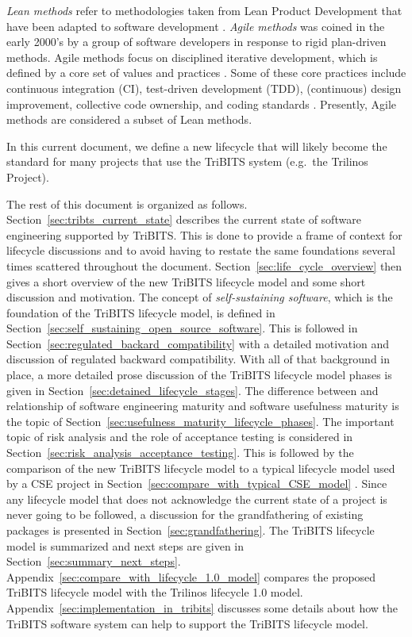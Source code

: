 \documentclass[11pt]{SANDreport}
\begin{document}
\textit{Lean methods} refer to methodologies taken from Lean Product Development that have been adapted to software development {}\cite{ImplementingLeanSoftwareDevelopment}.   \textit{Agile methods} was coined in the early 2000's by a group of software developers in response to rigid plan-driven methods. Agile methods focus on disciplined iterative development, which is defined by a core set of values and practices {}\cite{AgileSoftwareDevelopment, Scrum, XP2}.  Some of these core practices include continuous integration (CI), test-driven development (TDD), (continuous) design improvement, collective code ownership, and coding standards {}\cite{AgileSoftwareDevelopment, XP2}.  Presently, Agile methods are considered a subset of Lean methods.

In this current document, we define a new lifecycle that will likely become the standard for many projects that use the TriBITS system (e.g.\ the Trilinos Project).

The rest of this document is organized as follows. Section~\ref{sec:tribts_current_state} describes the current state of software engineering supported by TriBITS.  This is done to provide a frame of context for lifecycle discussions and to avoid having to restate the same foundations several times scattered throughout the document.  Section~\ref{sec:life_cycle_overview} then gives a short overview of the new TriBITS lifecycle model and some short discussion and motivation.  The concept of \textit{self-sustaining software}, which is the foundation of the TriBITS lifecycle model, is defined in Section~\ref{sec:self_sustaining_open_source_software}.  This is followed in Section~\ref{sec:regulated_backard_compatibility} with a detailed motivation and discussion of regulated backward compatibility.  With all of that background in place, a more detailed prose discussion of the TriBITS lifecycle model phases is given in Section~\ref{sec:detained_lifecycle_stages}.  The difference between and relationship of software engineering maturity and software usefulness maturity is the topic of Section~\ref{sec:usefulness_maturity_lifecycle_phases}.  The important topic of risk analysis and the role of acceptance testing is considered in Section~\ref{sec:risk_analysis_acceptance_testing}. This is followed by the comparison of the new TriBITS lifecycle model to a typical lifecycle model used by a CSE project in Section~\ref{sec:compare_with_typical_CSE_model} .  Since any lifecycle model that does not acknowledge the current state of a project is never going to be followed, a discussion for the grandfathering of existing packages is presented in Section~\ref{sec:grandfathering}.  The TriBITS lifecycle model is summarized and next steps are given in Section~\ref{sec:summary_next_steps}. Appendix~\ref{sec:compare_with_lifecycle_1.0_model} compares the proposed TriBITS lifecycle model with the Trilinos lifecycle 1.0 model.  Appendix~\ref{sec:implementation_in_tribits} discusses some details about how the TriBITS software system can help to support the TriBITS lifecycle model.
\end{document}
